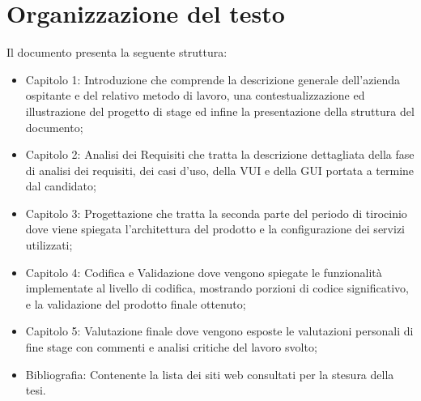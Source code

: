 \section{Organizzazione del testo}
Il documento presenta la seguente struttura:
\begin{itemize}
    \item Capitolo 1: Introduzione che comprende la descrizione generale dell'azienda ospitante e del relativo metodo di lavoro, una contestualizzazione ed illustrazione del progetto di stage ed infine la presentazione della struttura del documento;
    \item Capitolo 2: Analisi dei Requisiti che tratta la descrizione dettagliata della fase di analisi dei requisiti, dei casi d'uso, della VUI e della GUI portata a termine dal candidato;
    \item Capitolo 3: Progettazione che tratta la seconda parte del periodo di tirocinio dove viene spiegata l'architettura del prodotto e la configurazione dei servizi utilizzati;
    \item Capitolo 4: Codifica e Validazione dove vengono spiegate le funzionalità implementate al livello di codifica, mostrando porzioni di codice significativo, e la validazione del prodotto finale ottenuto;
    \item Capitolo 5: Valutazione finale dove vengono esposte le valutazioni personali di fine stage con commenti e analisi critiche del lavoro svolto;
    \item Bibliografia: Contenente la lista dei siti web consultati per la stesura della tesi.
\end{itemize}




